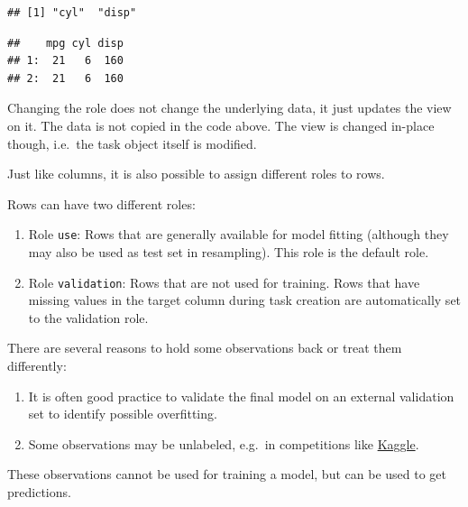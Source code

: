 \documentclass[
]{scrbook}
\newenvironment{Shaded}{\begin{snugshade}}{\end{snugshade}}
\newcommand{\AttributeTok}[1]{\textcolor[rgb]{0.77,0.63,0.00}{#1}}
\newcommand{\CommentTok}[1]{\textcolor[rgb]{0.56,0.35,0.01}{\textit{#1}}}
\newcommand{\DecValTok}[1]{\textcolor[rgb]{0.00,0.00,0.81}{#1}}
\newcommand{\FunctionTok}[1]{\textcolor[rgb]{0.00,0.00,0.00}{#1}}
\newcommand{\NormalTok}[1]{#1}
\newcommand{\SpecialCharTok}[1]{\textcolor[rgb]{0.00,0.00,0.00}{#1}}
\providecommand{\tightlist}{%
  \setlength{\itemsep}{0pt}\setlength{\parskip}{0pt}}
\renewenvironment{Shaded} {\begin{snugshade}\small} {\end{snugshade}}
\begin{document}
\begin{verbatim}
## [1] "cyl"  "disp"
\end{verbatim}

\begin{Shaded}
\end{Shaded}

\begin{verbatim}
##    mpg cyl disp
## 1:  21   6  160
## 2:  21   6  160
\end{verbatim}

Changing the role does not change the underlying data, it just updates the view on it.
The data is not copied in the code above.
The view is changed in-place though, i.e.~the task object itself is modified.

Just like columns, it is also possible to assign different roles to rows.

Rows can have two different roles:

\begin{enumerate}
\def\labelenumi{\arabic{enumi}.}
\item
  Role \texttt{use}:
  Rows that are generally available for model fitting (although they may also be used as test set in resampling).
  This role is the default role.
\item
  Role \texttt{validation}:
  Rows that are not used for training.
  Rows that have missing values in the target column during task creation are automatically set to the validation role.
\end{enumerate}

There are several reasons to hold some observations back or treat them differently:

\begin{enumerate}
\def\labelenumi{\arabic{enumi}.}
\tightlist
\item
  It is often good practice to validate the final model on an external validation set to identify possible overfitting.
\item
  Some observations may be unlabeled, e.g.~in competitions like \href{https://www.kaggle.com/}{Kaggle}.
\end{enumerate}

These observations cannot be used for training a model, but can be used to get predictions.
\end{document}
